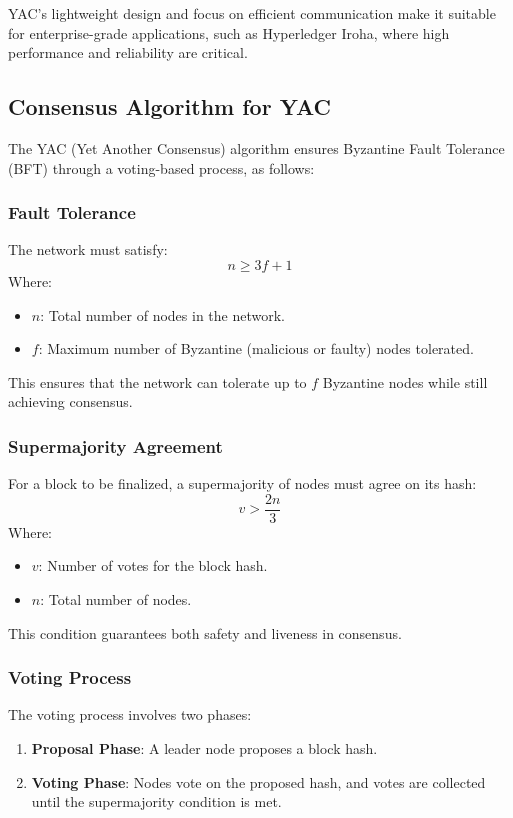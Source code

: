 \documentclass[final]{rc-book-2.14}
\begin{document}
YAC’s lightweight design and focus on efficient communication make it suitable for enterprise-grade applications, such as Hyperledger Iroha, where high performance and reliability are critical.

\subsection{Consensus Algorithm for YAC}

The YAC (Yet Another Consensus) algorithm ensures Byzantine Fault Tolerance (BFT) through a voting-based process, as follows:

\subsubsection{Fault Tolerance}

The network must satisfy:
\[
    n \geq 3f + 1
\]
Where:
\begin{itemize}
    \item \( n \): Total number of nodes in the network.
    \item \( f \): Maximum number of Byzantine (malicious or faulty) nodes tolerated.
\end{itemize}

This ensures that the network can tolerate up to \( f \) Byzantine nodes while still achieving consensus.

\subsubsection{Supermajority Agreement}
For a block to be finalized, a supermajority of nodes must agree on its hash:
\[
    v > \frac{2n}{3}
\]
Where:
\begin{itemize}
    \item \( v \): Number of votes for the block hash.
    \item \( n \): Total number of nodes.
\end{itemize}

This condition guarantees both safety and liveness in consensus.

\subsubsection{Voting Process}

The voting process involves two phases:
\begin{enumerate}
    \item \textbf{Proposal Phase}: A leader node proposes a block hash.
    \item \textbf{Voting Phase}: Nodes vote on the proposed hash, and votes are collected until the supermajority condition is met.
\end{enumerate}
\end{document}
